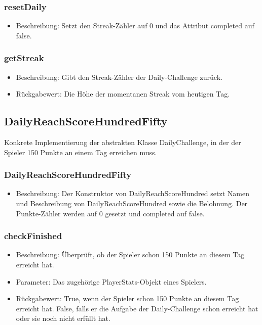 \documentclass[a4paper]{scrreprt}
\begin{document}
	\subsubsection{resetDaily}
	\begin{itemize}
		\item Beschreibung: Setzt den Streak-Zähler auf 0 und das Attribut completed auf false.
	\end{itemize}
	\subsubsection{getStreak}
	\begin{itemize}
		\item Beschreibung: Gibt den Streak-Zähler der Daily-Challenge zurück.
		\item Rückgabewert: Die Höhe der momentanen Streak vom heutigen Tag.
	\end{itemize}

	\subsection{DailyReachScoreHundredFifty}
	Konkrete Implementierung der abstrakten Klasse DailyChallenge, in der der Spieler 150 Punkte an einem Tag erreichen muss.
	\subsubsection{DailyReachScoreHundredFifty}
	\begin{itemize}
		\item Beschreibung: Der Konstruktor von DailyReachScoreHundred setzt Namen und Beschreibung von DailyReachScoreHundred sowie die Belohnung. Der Punkte-Zähler werden auf 0 gesetzt und completed auf false.
	\end{itemize}
	\subsubsection{checkFinished}
	\begin{itemize}
		\item Beschreibung: Überprüft, ob der Spieler schon 150 Punkte an diesem Tag erreicht hat.
		\item Parameter: Das zugehörige PlayerStats-Objekt eines Spielers.
		\item Rückgabewert: True, wenn der Spieler schon 150 Punkte an diesem Tag erreicht hat. False, falls er die Aufgabe der Daily-Challenge schon erreicht hat oder sie noch nicht erfüllt hat.
	\end{itemize}
\end{document}
